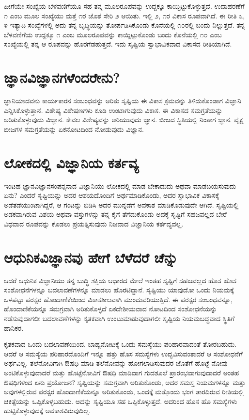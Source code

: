 ಹೀಗೆಯೇ ಸಂಖ್ಯೆಯ ಬೆಳವಣಿಗೆಯೂ ಸಹ ತನ್ನ ಮೂಲರೂಪವನ್ನು ಉದ್ದಕ್ಕೂ ಕಾಯ್ದಿಟ್ಟುಕೊಳ್ಳುತ್ತದೆ. ಉದಾಹರಣೆಗೆ ೧ ಎಂಬ ಮೂಲ ಸಂಖ್ಯೆಯು ಮತ್ತೆ ೧ರ ಜೊತೆ ಸೇರಿ ೨ ಆಯಿತು. ಇಲ್ಲಿ ೨, ೧ರ ವಿಕಾಸ ರೂಪವಾಗಿದೆ. ಈ ರೀತಿ ೩, ೪ ಇತ್ಯಾದಿ ಸಂಖ್ಯೆಗಳಲ್ಲಿ ಅದು ತನ್ನ ಬೃದ್ಧಿಯನ್ನು ತೋರ್ಪಡಿಸಿಕೊಂಡು ಕೊನೆಯಲ್ಲಿ ೧೦ರಲ್ಲಿ ಬಂದು ನಿಲ್ಲುತ್ತದೆ. ತನ್ನ ಬೆಳವಣಿಗೆಯ ಉದ್ದಕ್ಕೂ ೧ ಎಂಬ ಮೂಲರೂಪವನ್ನು ಕಾಯ್ದಿಟ್ಟುಕೊಂಡು ಬಂದು ಕೊನೆಯಲ್ಲಿ ೧೦ ಎಂಬ ಸಂಖ್ಯೆಯಲ್ಲಿ ತನ್ನ ಆ ರೂಪವನ್ನು  ಹೊರಗೆಡಹುತ್ತದೆ. ಇದು ಸೃಷ್ಟಿಯ ಸ್ವಾಭಾವಿಕವಾದ ವಿಕಾಸದ ರೀತಿಯಾಗಿದೆ.

\section*{ಜ್ಞಾನವಿಜ್ಞಾನಗಳೆಂದರೇನು?}

ಜ್ಞಾನಿಯಾದವನು ಕಾರ್ಯಕಾರನ ಸಂಬಂಧವನ್ನು ಅರಿತು ಸೃಷ್ಟಿಯ ಈ ವಿಕಾಸ ಕ್ರಮವನ್ನು ತಿಳಿದುಕೊಂಡಾಗ ವಿಜ್ಞಾನಿ ಎನ್ನಿಸಿಕೊಳ್ಳುತ್ತಾನೆ. ವಿಶೇಷ್ಯ ವಿಶೇಷಣಗಳು ಕೂಡಿ ಉಂಟಾಗುವುದು ವಿಕಾಸ. ಈ ವಿಕಾಸದ ಸಮಗ್ರತೆಯನ್ನು ಅರಿತುಕೊಳ್ಳುವುದು ವಿಜ್ಞಾನ. ಕೇವಲ ವಿಶೇಷ್ಯವನ್ನು ಅರಿಯುವುದು ಜ್ಞಾನ. ಬೀಜದ ಸ್ಥಿತಿಯಲ್ಲಿ ನಿಂತಾಗ ಜ್ಞಾನ. ವೃಕ್ಷ ಬೀಜಗಳ ಸಮಗ್ರತೆಯನ್ನು ಏಕನೋಟದಿಂದ ನೋಡುವುದು ವಿಜ್ಞಾನ.

\section*{ಲೋಕದಲ್ಲಿ ವಿಜ್ಞಾನಿಯ ಕರ್ತವ್ಯ}

ಇಂಟಹ ಜ್ಞಾನವಿಜ್ಞಾನಸಂಪನ್ನನಾದ ವಿಜ್ಞಾನಿಯು ಲೋಕದಲ್ಲಿ ಮಾಡ ಬೇಕಾದುದು ಅಥವಾ ಮಾಡಬಯಸುವುದು ಏನು? ಎಂದರೆ ಸೃಷ್ಟಿಯನ್ನು ಅದರ ಆಶಯದೊಂದಿಗೆ ಅರ್ಥಮಾಡಿಕೊಂಡು, ಅದರ ಸ್ವಾಭಾವಿಕ ವಿಕಾಸಕ್ಕೆ ಅಡೆತಡೆಯುಂಟಾಗಿದ್ದರೆ, ಆ ಗಂಟನ್ನು ಬಿಡಿಸಿ ಅದರ ಮುನ್ನಡೆಗೆ ಅವಕಾಶ ಮಾಡಿಕೊಡುವುದೇ ಆಗಿದೆ. ಸೃಷ್ಟಿಯಲ್ಲಿ ಅಡಕವಾಗಿರುವ ವಿಶಯ ಅಥವಾ ವಸ್ತುಗಳನ್ನು ತನ್ನ ಕೈಗೆ ತೆಗೆದುಕೊಂಡು ಅದಕ್ಕೆ ಸೃಷ್ಟಿಗೆ ಸಹಜವಲ್ಲದ ಬೇರೆ ವಿಧವಾದ ರೂಪವನ್ನು ಕೊಡಲು ಪ್ರಯತ್ನಿಸುವುದು ನಿಜವಾದ ವಿಜ್ಞಾನಿಯ ಕರ್ತವ್ಯವಲ್ಲ.

\section*{ಆಧುನಿಕವಿಜ್ಞಾನವು ಹೇಗೆ ಬೆಳೆದರೆ ಚೆನ್ನು}

ಆದರೆ ಆಧುನಿಕ ವಿಜ್ಞಾನಿಯು ತನ್ನ ಬುದ್ಧಿ ಶಕ್ತಿಯ ಆಧಾರದ ಮೇಲೆ ಇಂತಹ ಸೃಷ್ಟಿಗೆ ಸಹಜವಲ್ಲದ ಹೊಸ ಹೊಸ ಸಂಶೋಧನೆಗಳನ್ನೂ ಬದಲಾವಣೆಗಳನ್ನೂ ಮಾಡಲು ಹೊರಟಿದ್ದಾನೆ. ಸೃಷ್ಟಿಯು ಯಾವುದೋ ಒಂದು ನಿಯಮಕ್ಕೆ ಒಳಪಟ್ಟು ಪರಸ್ಪರ ಹೊಂದಾಣಿಕೆಯಿಂದ ವಿಕಾಸಶೀಲವಾಗಿ ಮುಂದುವರಿಯುತ್ತಿದೆ. ಈ ಪರಸ್ಪರ ಸಂಬಂಧವನ್ನೂ, ಹೊಂದಾಣಿಕೆಯನ್ನೂ ಸಮಗ್ರವಾಗಿ ಅರಿತುಕೊಳ್ಳದೆ ಏಕದೇಶೀಯವಾದ ನೋಟದಿಂದ ಸಂಶೋಧನೆಯನ್ನು ನಡೆಸುವುದಾಗಲೀ ಬದಲಾವಣೆಗಳನ್ನು ಕೃತಕವಾಗಿ ಉಂಟುಮಾಡುವುದಾಗಲೀ ಸೃಷ್ಟಿಯ ನಿಯಮಬದ್ಧವಾದ ಸ್ಥಿತಿಗೆ ಹಾನಿಕರ.

ಕೃತಕವಾದ ಒಂದು ಬದಲಾವಣೆಯಿಂದ, ಬಾಹ್ಯನೋಟಕ್ಕೆ ಒಂದು ಸಮಸ್ಯೆಯು ಪರಿಹಾರವಾದಂತೆ ತೋರಬಹುದು. ಆದರೆ ಆ ಸಮಸ್ಯೆಯ ಪರಿಹಾರದೊಂದಿಗೆ ಇನ್ನೂ ಹತ್ತು ಹೊಸ ಸಮಸ್ಯೆಗಳು ಉದ್ಭವಿಸುವಂತಾದರೆ ಆ ಸಂಶೋಧನೆಗೆ ಅರ್ಥವಿಲ್ಲ. ತಲೆನೋವಿಗಾಗಿ ಔಷಧಿ ಮಾಡಿ ತಲೆನೋವನ್ನು ಹೋಗಲಾಡಿಸುವುದರ ಜೊತೆಗೆ ಹೊಟ್ಟೆ ನೋವು ಅಂಟಿಕೊಳ್ಳುವುದಾದರೆ ಮತ್ತು ಹೊಟ್ಟೆನೋವಿಗೆ ಔಷಧಿ ಮಾಡಿದಾಗ ಗುದಶೂಲೆ ಪ್ರಾರಂಭವಾಗುವುದಾದರೆ ಅಂತಹ ಔಷಧಿಗಳಿಂದ ಏನು ಪ್ರಯೋಜನ? ಸೃಷ್ಟಿಯನ್ನು ಸಮಗ್ರವಾಗಿ ಅರಿತುಕೊಂಡು, ಅದರ ಸಮಸ್ತ ನಿಯಮಗಳನ್ನೂ ಮತ್ತು ಅವುಗಳಲ್ಲಿರುವ ಪರಸ್ಪರ ಹೊಂದಾಣಿಕೆಯನ್ನೂ ಅರಿತುಕೊಂಡು, ಒಂದಕ್ಕೆ ಮತ್ತೊಂದು ಭಂಗ ತಾರದಿರುವ ರೀತಿಯಲ್ಲಿ ಚಿಕಿತ್ಸೆಯನ್ನು ಒಪ್ಪಿಕೊಳ್ಳಬಹುದು. ಅದನ್ನು ಸೃಷ್ಟಿಯೂ ಸಹ ಒಪ್ಪಿಕೊಳ್ಳುತ್ತದೆ. ಅದರಿಂದ ಹೊಸ ಹೊ ಸಮಸ್ಯೆಗಳು ಹುಟ್ಟಿಕೊಳ್ಳುವುದಕ್ಕೆ ಅವಕಾಶವಿರುವುದಿಲ್ಲ.

